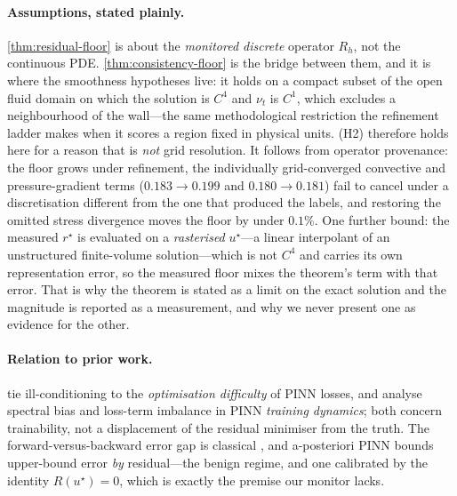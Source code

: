 \paragraph{Assumptions, stated plainly.} \autoref{thm:residual-floor} is about the
\emph{monitored discrete} operator $R_h$, not the continuous PDE.
\autoref{thm:consistency-floor} is the bridge between them, and it is where the smoothness
hypotheses live: it holds on a compact subset of the open fluid domain on which the
solution is $C^4$ and $\nu_t$ is $C^1$, which excludes a neighbourhood of the wall---the
same methodological restriction the refinement ladder makes when it scores a region fixed
in physical units. (H2) therefore holds here for a reason that is \emph{not} grid
resolution. It follows from operator provenance: the floor grows
under refinement, the individually grid-converged convective and pressure-gradient terms
($0.183\!\to\!0.199$ and $0.180\!\to\!0.181$) fail to cancel under a discretisation
different from the one that produced the labels, and restoring the omitted stress
divergence moves the floor by under $0.1\%$. One further bound: the measured
$r^\star$ is evaluated on a \emph{rasterised} $u^\star$---a linear interpolant of an
unstructured finite-volume solution---which is not $C^4$ and carries its own
representation error, so the measured floor mixes the theorem's term with that error. That
is why the theorem is stated as a limit on the exact solution and the magnitude is reported
as a measurement, and why we never present one as evidence for the other.

\paragraph{Relation to prior work.} \citet{krishnapriyan2021failure} tie ill-conditioning
to the \emph{optimisation difficulty} of PINN losses, and \citet{wang2022ntk} analyse
spectral bias and loss-term imbalance in PINN \emph{training dynamics}; both concern
trainability, not a displacement of the residual minimiser from the truth. The
forward-versus-backward error gap is classical \citep{trefethenbau1997}, and a-posteriori
PINN bounds upper-bound error \emph{by} residual---the benign regime, and one calibrated by
the identity $R(u^\star)=0$, which is exactly the premise our monitor lacks.

